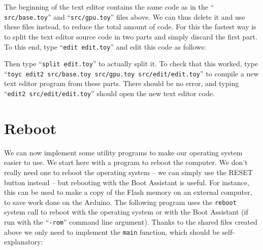 The beginning of the text editor contains the same code as in the ``{\tt
src/base.toy}'' and ``{\tt src/gpu.toy}'' files above. We can thus delete it
and use these files instead, to reduce the total amount of code. For this the
fastest way is to split the text editor source code in two parts and simply
discard the first part. To this end, type ``{\tt edit edit.toy}'' and edit this
code as follows:


Then type ``{\tt split edit.toy}'' to actually split it. To check that this
worked, type ``{\tt toyc edit2 src/base.toy src/gpu.toy src/edit/edit.toy}'' to
compile a new text editor program from these parts. There should be no error,
and typing ``{\tt edit2 src/edit/edit.toy}'' should open the new text editor
code.


\section{Reboot}

We can now implement some utility programs to make our operating system easier
to use. We start here with a program to reboot the computer. We don't really
need one to reboot the operating system -- we can simply use the RESET button
instead -- but rebooting with the Boot Assistant is useful. For instance, this
can be used to make a copy of the Flash memory on an external computer, to save
work done on the Arduino. The following program uses the {\tt reboot} system
call to reboot with the operating system or with the Boot Assistant (if run
with the ``{\tt -rom}'' command line argument). Thanks to the shared files
created above we only need to implement the {\tt main} function, which should
be self-explanatory:

